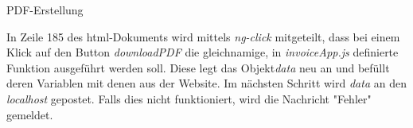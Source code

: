 \begin{description}
	\item[PDF-Erstellung]
    \hfill
    \label{sec:PDF}
\end{description}
%


In Zeile 185 des html-Dokuments wird mittels \textit{ng-click} mitgeteilt, dass bei einem Klick auf den Button \textit{downloadPDF} die gleichnamige, in \textit{invoiceApp.js} definierte Funktion ausgeführt werden soll. 
Diese legt das Objekt\textit{data} neu an und befüllt deren Variablen mit denen aus der Website. Im nächsten Schritt wird \textit{data} an den \textit{localhost} gepostet. Falls dies nicht funktioniert, wird die Nachricht "Fehler" gemeldet.




